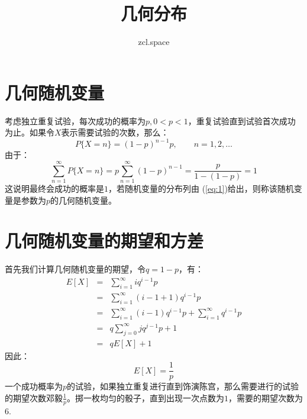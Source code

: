 \documentclass[10pt,a4paper,UTF8]{article}
\author{zcl.space}
\date{}
\title{几何分布}
\begin{document}
\maketitle
\tableofcontents
{}

\section{几何随机变量}
\label{sec:orgba1f81b}


考虑独立重复试验，每次成功的概率为\(p,0 < p < 1\)，重复试验直到试验首次成功为止。如果令\(X\)表示需要试验的次数，那么：
\begin{equation}
\label{eq:1}
P\{X=n\} = (1-p)^{n-1}p,\qquad n = 1,2,\ldots
\end{equation}
由于：
\begin{equation}
\label{eq:2}
\sum_{n=1}^{\infty} P\{X=n\} = p \sum_{n=1}^{\infty} ( 1-p)^{n-1} = \frac{p}{1-(1-p)} = 1
\end{equation}
这说明最终会成功的概率是\(1\)，若随机变量的分布列由 (\ref{eq:1})给出，则称该随机变量是参数为\(p\)的几何随机变量。
\section{几何随机变量的期望和方差}
\label{sec:org48724a6}


首先我们计算几何随机变量的期望，令\(q = 1-p\)，有：
\begin{eqnarray}
\label{eq:3}
E[X]&=& \sum_{i=1}^{\infty} iq^{i-1}p \\
&=& \sum_{i=1}^{\infty}(i-1+1)q^{i-1}p \\
&=&\sum_{i=1}^{\infty}(i-1)q^{i-1}p + \sum_{i=1}^{\infty} q^{i-1}p \\
&=& q\sum_{j=0}^{\infty}jq^{j-1}p + 1\\
&=&qE[X] + 1
\end{eqnarray}
因此：\[E[X] = \frac{1}{p}\]
一个成功概率为\(p\)的试验，如果独立重复进行直到饰演陈宫，那么需要进行的试验的期望次数邓毅\(\tfrac{1}{p}\)。掷一枚均匀的骰子，直到出现一次点数为\(1\)，需要的期望次数为\(6\).
\end{document}
